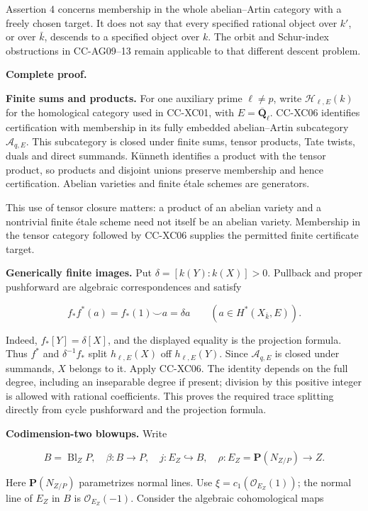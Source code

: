 Assertion 4 concerns membership in the whole abelian--Artin category
with a freely chosen target. It does not say that every specified
rational object over \(k'\), or over \(\bar k\), descends to a specified
object over \(k\). The orbit and Schur-index obstructions in CC-AG09--13
remain applicable to that different descent problem.

\textbf{Complete proof.}

\textbf{Finite sums and products.} For one auxiliary prime
\(\ell\ne p\), write \(\mathcal H_{\ell,E}(k)\) for the homological
category used in CC-XC01, with \(E=\overline{\mathbf Q}_\ell\). CC-XC06
identifies certification with membership in its fully embedded
abelian--Artin subcategory \(\mathcal A_{q,E}\). This subcategory is
closed under finite sums, tensor products, Tate twists, duals and direct
summands. Künneth identifies a product with the tensor product, so
products and disjoint unions preserve membership and hence
certification. Abelian varieties and finite étale schemes are
generators.

This use of tensor closure matters: a product of an abelian variety and
a nontrivial finite étale scheme need not itself be an abelian variety.
Membership in the tensor category followed by CC-XC06 supplies the
permitted finite certificate target.

\textbf{Generically finite images.} Put \(\delta=[k(Y):k(X)]>0\).
Pullback and proper pushforward are algebraic correspondences and
satisfy

\[
 f_*f^*(a)=f_*(1)\smile a=\delta a
 \qquad(a\in H^*(X_{\bar k},E)).
 \tag{CC-XC.F11}
\]

Indeed, \(f_*[Y]=\delta[X]\), and the displayed equality is the
projection formula. Thus \(f^*\) and \(\delta^{-1}f_*\) split
\(h_{\ell,E}(X)\) off \(h_{\ell,E}(Y)\). Since \(\mathcal A_{q,E}\) is
closed under summands, \(X\) belongs to it. Apply CC-XC06. The identity
depends on the full degree, including an inseparable degree if present;
division by this positive integer is allowed with rational coefficients.
This proves the required trace splitting directly from cycle pushforward
and the projection formula.

\textbf{Codimension-two blowups.} Write

\[
 B=\operatorname{Bl}_ZP,\quad
 \beta:B\to P,\quad
 j:E_Z\hookrightarrow B,\quad
 \rho:E_Z=\mathbf P(N_{Z/P})\to Z.
\]

Here \(\mathbf P(N_{Z/P})\) parametrizes normal lines. Use
\(\xi=c_1(\mathcal O_{E_Z}(1))\); the normal line of \(E_Z\) in \(B\) is
\(\mathcal O_{E_Z}(-1)\). Consider the algebraic cohomological maps

